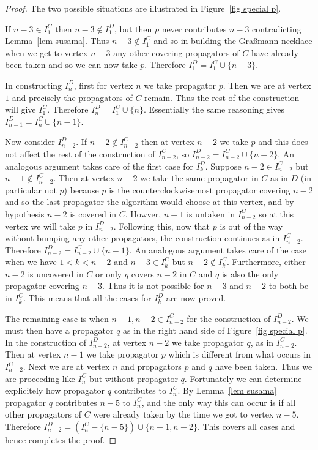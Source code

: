 \documentclass[11pt]{article}
\theoremstyle{remark}
\theoremstyle{definition}
\begin{document}
\begin{proof}
  The two possible situations are illustrated in Figure~\ref{fig special p}.

  If $n-3\in I_1^{C}$ then $n-3\not\in I_1^{D}$, but then $p$ never contributes $n-3$ contradicting Lemma~\ref{lem susama}.  Thus $n-3\not\in I_1^{C}$ and so in building the Gra\ss mann necklace when we get to vertex $n-3$ any other covering propagators of $C$ have already been taken and so we can now take $p$.  Therefore $I_1^{D}= I_1^{C}\cup \{n-3\}$.

  In constructing $I_n^{D}$, first for vertex $n$ we take propagator $p$.  Then we are at vertex $1$ and precisely the propagators of $C$ remain.  Thus the rest of the construction will give $I_1^{C}$.  Therefore $I_n^{D} = I_1^{C}\cup \{n\}$.  Essentially the same reasoning gives $I_{n-1}^{D} = I_n^{C}\cup \{n-1\}$.

  Now consider $I_{n-2}^{D}$.  If $n-2\not\in I_{n-2}^{C}$ then at vertex $n-2$ we take $p$ and this does not affect the rest of the construction of $I_{n-2}^{C}$, so $I_{n-2}^{D} = I_{n-2}^{C}\cup \{n-2\}$.  An analogous argument takes care of the first case for $I_k^{D}$.  Suppose $n-2\in I_{n-2}^{C}$ but $n-1\not\in I_{n-2}^{C}$.  Then at vertex $n-2$ we take the same propagator in $C$ as in $D$ (in particular not $p$) because $p$ is the counterclockwisemost propagator covering $n-2$ and so the last propagator the algorithm would choose at this vertex, and by hypothesis $n-2$ is covered in $C$.  Howver, $n-1$ is untaken in $I_{n-2}^{C}$ so at this vertex we will take $p$ in $I_{n-2}^{D}$.  Following this, now that $p$ is out of the way without bumping any other propagators, the construction continues as in $I_{n-2}^{C}$.  Therefore $I_{n-2}^{D} = I_{n-2}^{C}\cup \{n-1\}$.  An analogous argument takes care of the case when we have $1<k<n-2$ and $n-3\in I_k^{C}$ but $n-2\not\in I_{k}^{C}$.  Furthermore, either $n-2$ is uncovered in $C$ or only $q$ covers $n-2$ in $C$ and $q$ is also the only propagator covering $n-3$.  Thus it is not possible for $n-3$ and $n-2$ to both be in $I_{k}^{C}$.  This means that all the cases for $I_k^{D}$ are now proved.

  The remaining case is when $n-1,n-2\in I_{n-2}^{C}$ for the construction of $I_{n-2}^{D}$.  We must then have a propagator $q$ as in the right hand side of Figure~\ref{fig special p}.  In the construction of $I_{n-2}^{D}$, at vertex $n-2$ we take propagator $q$, as in $I_{n-2}^{C}$.  Then at vertex $n-1$ we take propagator $p$ which is different from what occurs in $I_{n-2}^{C}$.  Next we are at vertex $n$ and propagators $p$ and $q$ have been taken.  Thus we are proceeding like $I_{n}^{C}$ but without propagator $q$.  Fortunately we can determine explicitely how propagator $q$ contributes to $I_{n}^{C}$.  By Lemma~\ref{lem susama} propagator $q$ contributes $n-5$ to $I_{n}^{C}$, and the only way this can occur is if all other propagators of $C$ were already taken by the time we got to vertex $n-5$.  Therefore $I_{n-2}^{D} = (I_{n}^{C} - \{n-5\}) \cup \{n-1, n-2\}$.  This covers all cases and hence completes the proof.
\end{proof}
\end{document}
